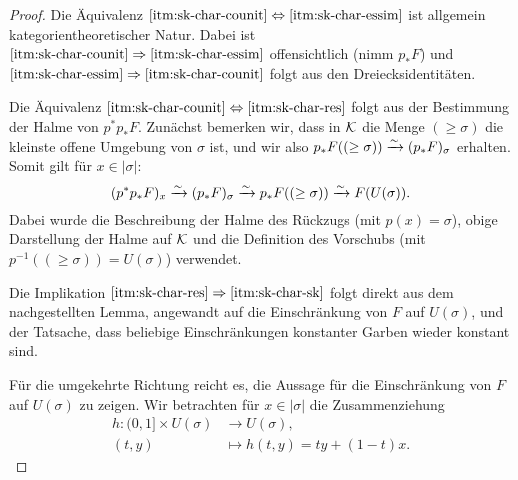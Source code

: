 \begin{proof}
  Die Äquivalenz $\ref{itm:sk-char-counit} \Leftrightarrow
  \ref{itm:sk-char-essim}$ ist allgemein kategorientheoretischer
  Natur. Dabei ist $\ref{itm:sk-char-counit} \Rightarrow
  \ref{itm:sk-char-essim}$ offensichtlich (nimm $p_* F$) und
  $\ref{itm:sk-char-essim} \Rightarrow \ref{itm:sk-char-counit}$ folgt
  aus den Dreiecksidentitäten.

  Die Äquivalenz $\ref{itm:sk-char-counit} \Leftrightarrow \ref{itm:sk-char-res}$
  folgt aus der Bestimmung der Halme von $p^*p_* F$. Zunächst bemerken
  wir, dass in $\mathcal{K}$ die Menge $(\geq \sigma)$ die kleinste offene
  Umgebung von $\sigma$ ist, und wir also $p_*F((\geq \sigma)) \xrightarrow[]{\sim}
  (p_*F)_{\sigma}$ erhalten. Somit gilt für $x \in |\sigma|$:
  \begin{equation}\label{eq:counit-sect}
    (p^*p_*F)_x \xrightarrow[]{\sim} (p_*F)_{\sigma} \xrightarrow[]{\sim} p_*F((\geq \sigma)) \xrightarrow[]{\sim} F(U(\sigma)).  
  \end{equation}  
  Dabei wurde die Beschreibung der Halme des Rückzugs (mit $p(x) =
  \sigma$), obige Darstellung der Halme auf $\mathcal{K}$ und die Definition
  des Vorschubs (mit $p^{-1}((\geq \sigma)) = U(\sigma)$) verwendet.

  Die Implikation $\ref{itm:sk-char-res} \Rightarrow
  \ref{itm:sk-char-sk}$ folgt direkt aus dem nachgestellten Lemma,
  angewandt auf die Einschränkung von $F$ auf $U(\sigma)$, und der
  Tatsache, dass beliebige Einschränkungen konstanter Garben wieder
  konstant sind.

  Für die umgekehrte Richtung reicht es, die Aussage für die
  Einschränkung von $F$ auf $U(\sigma)$ zu zeigen.  Wir betrachten für
  $x \in |\sigma|$ die Zusammenziehung
  \begin{align*}
    h: (0, 1] \times U(\sigma) &\to U(\sigma), \\
    (t, y) &\mapsto h(t, y) = t y + (1 - t) x.
  \end{align*}
  

\end{proof}
